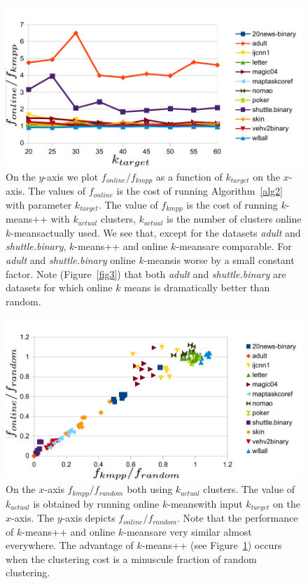 \documentclass[11pt,twoside]{article}
\newcommand{\kmeans}{$k$-means}
\begin{document}
\begin{figure}[htbp]
\begin{center}
\includegraphics{figures/plot4.pdf}
\caption{On the $y$-axis we plot $f_{online}/f_{kmpp}$ as a function of $k_{target}$ on the $x$-axis. The values of $f_{online}$ is the cost of running Algorithm~\ref{alg2} with parameter $k_{target}$.
The value of $f_{kmpp}$ is the cost of running \kmeans++ with $k_{actual}$ clusters, $k_{actual}$ is the number of clusters online \kmeans actually used.
We see that, except for the datasets \emph{adult} and \emph{shuttle.binary}, \kmeans++ and online \kmeans are comparable. For \emph{adult} and \emph{shuttle.binary} online \kmeans is worse by a small constant factor. Note (Figure~\ref{fig3}) that both \emph{adult} and \emph{shuttle.binary} are datasets for which online $k$ means is dramatically better than random.}
\label{fig4}
\end{center}
\end{figure}

\begin{figure}[htbp]
\begin{center}
\includegraphics{figures/plot5.pdf}
\caption{On the $x$-axis $f_{kmpp}/f_{random}$ both using $k_{actual}$ clusters. 
The value of $k_{actual}$ is obtained by running online \kmeans with input $k_{target}$ on the $x$-axis.
The $y$-axis depicts $f_{online}/f_{random}$. 
Note that the performance of \kmeans++ and online \kmeans are very similar almost everywhere.
The advantage of \kmeans++ (see Figure~\ref{fig4}) occurs when the clustering cost is a minuscule fraction of random clustering.}
\label{fig5}
\end{center}
\end{figure}
\end{document}
